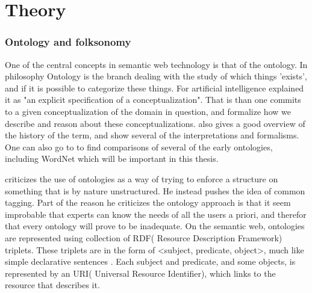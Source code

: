 
\chapter{Theory} %

\label{Theory} %


\subsection{Ontology and folksonomy}
One of the central concepts in semantic web technology is that of the ontology. 
In philosophy Ontology is the branch dealing with the study of which things 'exists', and if it is possible to categorize these things. 
For artificial intelligence \citet{Gruber1993} explained it as "an explicit specification of a conceptualization". 
That is than one commits to a given conceptualization of the domain in question, and formalize how we describe and reason about these conceptualizations. 
\citet{Pretorius2004} also gives a good overview of the history of the term, and show several of the interpretations and formalisms. 
One can also go to \citet{Noy1997} to find comparisons of several of the early ontologies, including WordNet which will be important in this thesis.

\citet{Shirky2007} criticizes the use of ontologies as a way of trying to enforce a structure on something that is by nature unstructured. 
He instead pushes the idea of common tagging. 
Part of the reason he criticizes the ontology approach is that it seem improbable that experts can know the needs of all the users a priori, and therefor that every ontology will prove to be inadequate.
On the semantic web, ontologies are represented using collection of RDF( Resource Description Framework) triplets. 
These triplets are in the form of <subject, predicate, object>, much like simple declarative sentences \citep{Berners-Lee2001}. 
Each subject and predicate, and some objects, is represented by an URI( Universal Resource Identifier), which links to the resource that describes it.

